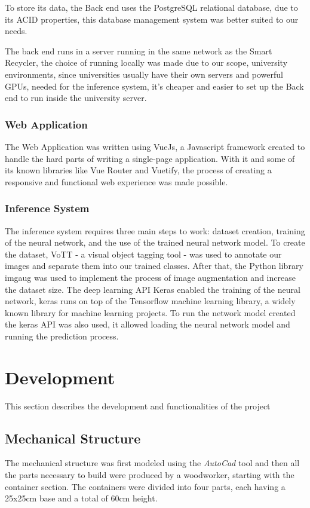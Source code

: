 \documentclass[a4paper,11pt]{article}
\begin{document}
To store its data, the Back end uses the PostgreSQL\cite{postgre} relational database, due to its ACID properties, this database management system was better suited to our needs.

The back end runs in a server running in the same network as the Smart Recycler, the choice of running locally was made due to our scope, university environments, since universities usually have their own servers and powerful GPUs, needed for the inference system, it’s cheaper and easier to set up the Back end to run inside the university server.

\subsubsection{Web Application}
The Web Application was written using VueJs\cite{vuejs}, a Javascript framework created to handle the hard parts of writing a single-page application. With it and some of its known libraries like Vue Router and Vuetify, the process of creating a responsive and functional web experience was made possible.

\subsubsection{Inference System}
The inference system requires three main steps to work: dataset creation, training of the neural network, and the use of the trained neural network model. To create the dataset, VoTT\cite{vott} - a visual object tagging tool - was used to annotate our images and separate them into our trained classes. After that, the Python library imgaug was used to implement the process of image augmentation and increase the dataset size. The deep learning API Keras\cite{keras} enabled the training of the neural network, keras runs on top of the Tensorflow\cite{tensorflow} machine learning library, a widely known library for machine learning projects. To run the network model created the keras API was also used, it allowed loading the neural network model and running the prediction process.

\section{Development}
\label{sec:dev}
This section describes the development and functionalities of the project

\subsection{Mechanical Structure}
\label{subsec:Mechanical}
The mechanical structure was first modeled using the \textit{AutoCad} \cite{AutoCad} tool and then all the parts necessary to build were produced by a woodworker, starting with the container section. The containers were divided into four parts, each having a 25x25cm base and a total of 60cm height.
\end{document}
